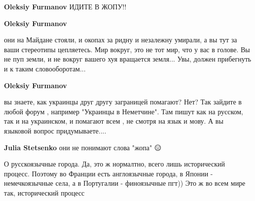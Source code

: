 \begin{itemize}
\begin{itemize}
 
\textbf{Oleksiy Furmanov} ИДИТЕ В ЖОПУ!!

 
\textbf{Oleksiy Furmanov} 

они на Майдане стояли, и окопах за ридну и незалежну умирали, а вы тут за ваши
стереотипы цепляетесь. Мир вокруг, это не тот мир, что у вас в голове. Вы не
пуп земли, и не вокруг вашего хуя вращается земля... Увы, должен прибегнуть и к
таким словооборотам...


 
\textbf{Oleksiy Furmanov} 

вы знаете, как украинцы друг другу заграницей помагают? Нет? Так зайдите в
любой форум , например "Украинцы в Неметчине". Там пишут как на русском, так и
на украинском, и помагают всем , не смотря на язык и мову. А вы языковой вопрос
придумываете....

 
\textbf{Julia Stetsenko} они не понимают слова "жопа" 😑

\end{itemize}

 

О русскоязычные города. Да, это ж нормалтно, всего лишь исторический процесс.
Поэтому во Франции есть англоязычные города, в Японии - немечкоязычные села, а
в Португалии - финоязычные пгт)) Это ж во всем мире так, исторический процесс
🤣🤣🤣



\end{itemize}
